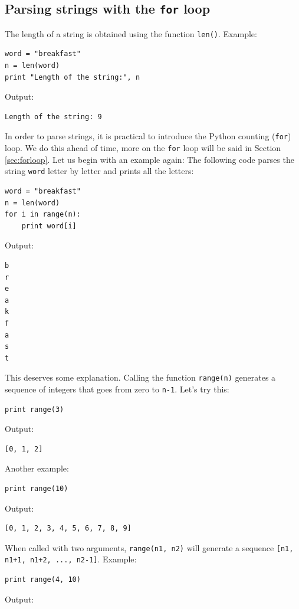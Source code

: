 \subsection{Parsing strings with the {\tt for} loop}\label{subsec:forstr} 

The length of a string is obtained using the function {\tt len()}.
Example:

\begin{verbatim}
word = "breakfast"
n = len(word)
print "Length of the string:", n
\end{verbatim}
Output:

\begin{verbatim}
Length of the string: 9
\end{verbatim}
In order to parse strings, it is practical to introduce the Python counting 
({\tt for}) loop. We do this ahead of time, more on the {\tt for} loop will 
be said in Section \ref{sec:forloop}. Let us begin with an example again: The
following code parses the string {\tt word} letter by letter and prints all
the letters:

\begin{verbatim}
word = "breakfast"
n = len(word)
for i in range(n):
    print word[i]
\end{verbatim}
Output:

\begin{verbatim}
b
r
e
a
k
f
a
s
t
\end{verbatim}
This deserves some explanation. Calling the function {\tt range(n)} generates 
a sequence of integers that goes from zero to {\tt n-1}. Let's try this:

\begin{verbatim}
print range(3)
\end{verbatim}
Output:

\begin{verbatim}
[0, 1, 2]
\end{verbatim}
Another example:

\begin{verbatim}
print range(10)
\end{verbatim}
Output:

\begin{verbatim}
[0, 1, 2, 3, 4, 5, 6, 7, 8, 9]
\end{verbatim}
When called with two arguments, {\tt range(n1, n2)} will generate 
a sequence {\tt [n1, n1+1, n1+2, ..., n2-1]}. Example:

\begin{verbatim}
print range(4, 10)
\end{verbatim}
Output:

